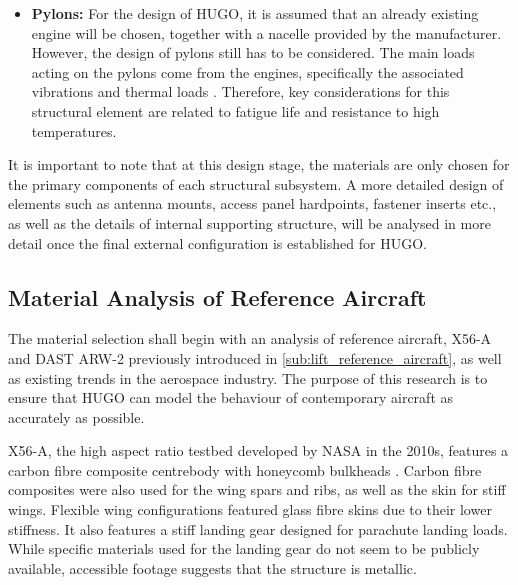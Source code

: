 \begin{itemize}
    \item \textbf{Pylons:} For the design of HUGO, it is assumed that an already existing engine will be chosen, together with a nacelle provided by the manufacturer. However, the design of pylons still has to be considered. The main loads acting on the pylons come from the engines, specifically the associated vibrations and thermal loads \cite{pylon_load_analysis}. Therefore, key considerations for this structural element are related to fatigue life and resistance to high temperatures.    

\end{itemize}

It is important to note that at this design stage, the materials are only chosen for the primary components of each structural subsystem. A more detailed design of elements such as antenna mounts, access panel hardpoints, fastener inserts etc., as well as the details of internal supporting structure, will be analysed in more detail once the final external configuration is established for HUGO. 


\subsection{Material Analysis of Reference Aircraft}
\label{sub:materials_reference_aircraft}
The material selection shall begin with an analysis of reference aircraft, X56-A and DAST ARW-2 previously introduced in \autoref{sub:lift_reference_aircraft}, as well as existing trends in the aerospace industry. The purpose of this research is to ensure that HUGO can model the behaviour of contemporary aircraft as accurately as possible.

X56-A, the high aspect ratio testbed developed by NASA in the 2010s, features a carbon fibre composite centrebody with honeycomb bulkheads \cite{X56-AMaterials}. Carbon fibre composites were also used for the wing spars and ribs, as well as the skin for stiff wings. Flexible wing configurations featured glass fibre skins due to their lower stiffness. It also features a stiff landing gear designed for parachute landing loads. While specific materials used for the landing gear do not seem to be publicly available, accessible footage suggests that the structure is metallic.

